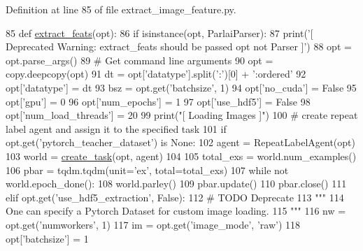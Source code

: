 Definition at line 85 of file extract\+\_\+image\+\_\+feature.\+py.


\begin{DoxyCode}
85 \textcolor{keyword}{def }\hyperlink{namespaceparlai_1_1scripts_1_1extract__image__feature_a6e3b12d361756ec79fbd44abd185387b}{extract\_feats}(opt):
86     \textcolor{keywordflow}{if} isinstance(opt, ParlaiParser):
87         print(\textcolor{stringliteral}{'[ Deprecated Warning: extract\_feats should be passed opt not Parser ]'})
88         opt = opt.parse\_args()
89     \textcolor{comment}{# Get command line arguments}
90     opt = copy.deepcopy(opt)
91     dt = opt[\textcolor{stringliteral}{'datatype'}].split(\textcolor{stringliteral}{':'})[0] + \textcolor{stringliteral}{':ordered'}
92     opt[\textcolor{stringliteral}{'datatype'}] = dt
93     bsz = opt.get(\textcolor{stringliteral}{'batchsize'}, 1)
94     opt[\textcolor{stringliteral}{'no\_cuda'}] = \textcolor{keyword}{False}
95     opt[\textcolor{stringliteral}{'gpu'}] = 0
96     opt[\textcolor{stringliteral}{'num\_epochs'}] = 1
97     opt[\textcolor{stringliteral}{'use\_hdf5'}] = \textcolor{keyword}{False}
98     opt[\textcolor{stringliteral}{'num\_load\_threads'}] = 20
99     print(\textcolor{stringliteral}{"[ Loading Images ]"})
100     \textcolor{comment}{# create repeat label agent and assign it to the specified task}
101     \textcolor{keywordflow}{if} opt.get(\textcolor{stringliteral}{'pytorch\_teacher\_dataset'}) \textcolor{keywordflow}{is} \textcolor{keywordtype}{None}:
102         agent = RepeatLabelAgent(opt)
103         world = \hyperlink{namespaceparlai_1_1core_1_1worlds_a79969c7ba76d4b3c500f5bb776444dc6}{create\_task}(opt, agent)
104 
105         total\_exs = world.num\_examples()
106         pbar = tqdm.tqdm(unit=\textcolor{stringliteral}{'ex'}, total=total\_exs)
107         \textcolor{keywordflow}{while} \textcolor{keywordflow}{not} world.epoch\_done():
108             world.parley()
109             pbar.update()
110         pbar.close()
111     \textcolor{keywordflow}{elif} opt.get(\textcolor{stringliteral}{'use\_hdf5\_extraction'}, \textcolor{keyword}{False}):
112         \textcolor{comment}{# TODO Deprecate}
113         \textcolor{stringliteral}{"""}
114 \textcolor{stringliteral}{        One can specify a Pytorch Dataset for custom image loading.}
115 \textcolor{stringliteral}{        """}
116         nw = opt.get(\textcolor{stringliteral}{'numworkers'}, 1)
117         im = opt.get(\textcolor{stringliteral}{'image\_mode'}, \textcolor{stringliteral}{'raw'})
118         opt[\textcolor{stringliteral}{'batchsize'}] = 1

\end{DoxyCode}
